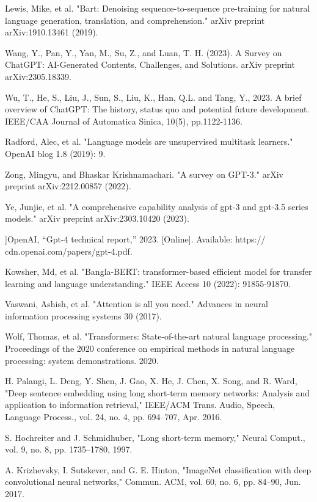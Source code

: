 \documentclass[conference]{IEEEtran}
\begin{document}
\begin{thebibliography}{00}
 Lewis, Mike, et al. "Bart: Denoising sequence-to-sequence pre-training for natural language generation, translation, and comprehension." arXiv preprint arXiv:1910.13461 (2019).

 Wang, Y., Pan, Y., Yan, M., Su, Z., and Luan, T. H. (2023). A Survey on ChatGPT: AI-Generated Contents, Challenges, and Solutions. arXiv preprint arXiv:2305.18339.

 Wu, T., He, S., Liu, J., Sun, S., Liu, K., Han, Q.L. and Tang, Y., 2023. A brief overview of ChatGPT: The history, status quo and potential future development. IEEE/CAA Journal of Automatica Sinica, 10(5), pp.1122-1136.

 Radford, Alec, et al. "Language models are unsupervised multitask learners." OpenAI blog 1.8 (2019): 9.

 Zong, Mingyu, and Bhaskar Krishnamachari. "A survey on GPT-3." arXiv preprint arXiv:2212.00857 (2022).

 Ye, Junjie, et al. "A comprehensive capability analysis of gpt-3 and gpt-3.5 series models." arXiv preprint arXiv:2303.10420 (2023).

]OpenAI, “Gpt-4 technical report,” 2023. [Online]. Available: https:// cdn.openai.com/papers/gpt-4.pdf.

 Kowsher, Md, et al. "Bangla-BERT: transformer-based efficient model for transfer learning and language understanding." IEEE Access 10 (2022): 91855-91870.

 Vaswani, Ashish, et al. "Attention is all you need." Advances in neural information processing systems 30 (2017).

 Wolf, Thomas, et al. "Transformers: State-of-the-art natural language processing." Proceedings of the 2020 conference on empirical methods in natural language processing: system demonstrations. 2020.

 H. Palangi, L. Deng, Y. Shen, J. Gao, X. He, J. Chen, X. Song, and R. Ward, "Deep sentence embedding using long short-term memory networks: Analysis and application to information retrieval," IEEE/ACM Trans. Audio, Speech, Language Process., vol. 24, no. 4, pp. 694–707, Apr. 2016.

 S. Hochreiter and J. Schmidhuber, "Long short-term memory," Neural Comput., vol. 9, no. 8, pp. 1735–1780, 1997.

 A. Krizhevsky, I. Sutskever, and G. E. Hinton, "ImageNet classification with deep convolutional neural networks," Commun. ACM, vol. 60, no. 6, pp. 84–90, Jun. 2017.


\end{thebibliography}
\end{document}

